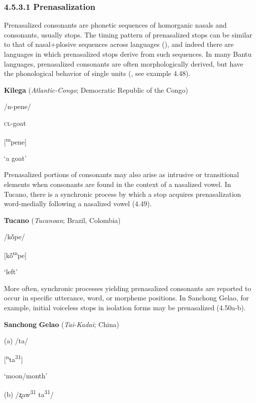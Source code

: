 \subsubsection{\textbf{4.5.3.1} \textbf{Prenasalization} }

  Prenasalized consonants are phonetic sequences of homorganic nasals and consonants, usually stops. The timing pattern of prenasalized stops can be similar to that of nasal+plosive sequences across languages (\citealt{BrowmanGoldstein1986}), and indeed there are languages in which prenasalized stops derive from such sequences. In many Bantu languages, prenasalized consonants are often morphologically derived, but have the phonological behavior of single units (\citealt{Tak2011}, see example 4.48).

\ea\label{ex:(4.48)}
  \textbf{Kilega} (\textit{Atlantic-Congo}; Democratic Republic of the Congo)

/n-pene/

\textsc{cl}-goat

[\textsuperscript{m}pene]

‘a goat’

\citep[132]{Tak2011}

\z

  Prenasalized portions of consonants may also arise as intrusive or transitional elements when consonants are found in the context of a nasalized vowel. In Tucano, there is a synchronic process by which a stop acquires prenasalization word-medially following a nasalized vowel (4.49).

\ea\label{ex:(4.49)}
  \textbf{Tucano} (\textit{Tucanoan}; Brazil, Colombia)

/kṍpe/

[kṍ\textsuperscript{m}pe]

‘left’

\citep[11]{West1980}

\z

  More often, synchronic processes yielding prenasalized consonants are reported to occur in specific utterance, word, or morpheme positions. In Sanchong Gelao, for example, initial voiceless stops in isolation forms may be prenasalized (4.50a-b).

\ea\label{ex:(4.50)}
  \textbf{Sanchong} \textbf{Gelao} (\textit{Tai-Kadai}; China)

(a)  /ta/

  [\textsuperscript{n}ta\textsuperscript{31}]

  ‘moon/month’

(b)  /ʐaw\textsuperscript{31}   ta\textsuperscript{31}/

